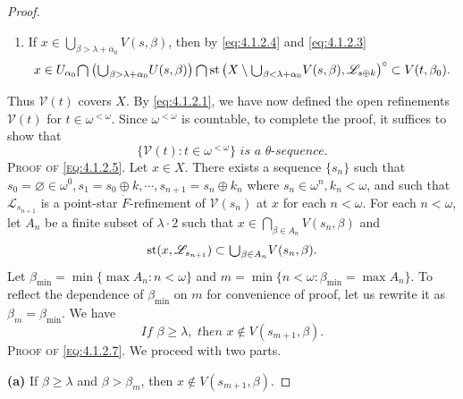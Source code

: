 \documentclass[main.tex]{subfiles}
\begin{document}
\begin{proof}
\begin{enumerate}
$$	\subset V(t, \alpha_{0}).$$
\item[(b)] If $x \in \bigcup_{\beta > \lambda + \alpha_{0}} V(s, \beta)$, 
	then by \eqref{eq:4.1.2.4} and \eqref{eq:4.1.2.3}
	$$ x \in U_{\alpha_{0}} \raisebox{-2pt}{\scalebox{1.5}{$\cap$}} \left(\raisebox{-2pt}{\scalebox{1.5}{$\cup$}}_{\beta > \lambda + \alpha_{0}} U(s, \beta)\right) 
	\raisebox{-2pt}{\scalebox{1.5}{$\cap$}} \operatorname{st}\left(X\setminus\raisebox{-2pt}{\scalebox{1.5}{$\cup$}}_{\beta < \lambda + \alpha_{0}} V(s, \beta), 	\mathscr{L}_{s \oplus k}\right)^{\circ} 
	\subset V(t, \beta_0).$$
\end{enumerate}
Thus $\mathscr{V}(t)$ covers $X$. 
By  \eqref{eq:4.1.2.1}, we have now defined the open refinements 
$\mathscr{V}(t)$ for $t \in \omega^{<\omega}$.
Since $\omega^{<\omega}$ is countable, to complete the proof, it suffices to show that
\begin{equation}
	\{\mathscr{V}(t): t \in \omega^{<\omega}\} \textit{ is a } \theta\textit{-sequence.}  \label{eq:4.1.2.5}
\end{equation}
\textsc{Proof of \eqref{eq:4.1.2.5}}. Let $x \in X$. There exists a sequence $\{s_n\}$ such that 
$s_0 = \varnothing\in \omega^0, s_1 = s_0\oplus k, 
\cdots, s_{n+1} = s_n \oplus k_n$ where $s_n \in \omega^n, k_n < \omega$, 
and such that $\mathscr{L}_{s_{n+1}}$ is a point-star $\dot{F}$-refinement of
$\mathscr{V}(s_n)$ at $x$ for each $n < \omega$.
For each $n < \omega$, let $A_n$ be a finite subset of $\lambda\cdot 2$ such that 
$x \in \bigcap_{\beta \in A_n} V(s_n, \beta)$ and
\begin{equation}
	\operatorname{st}(x, \mathscr{L}_{s_{n+1}}) \subset \raisebox{-2pt}{\scalebox{1.5}{$\cup$}}_{\beta \in A_n} V(s_n, \beta).
   \label{eq:4.1.2.6}  %
\end{equation}
\noindent Let $\beta_{\min} = \min\{\max A_n: n < \omega\}$ and 
$m = \min\{n < \omega: \beta_{\min} = \max A_n\}$. 
To reflect the dependence of $\beta_{\min}$ on $m$ for convenience of proof, 
let us rewrite it as $\beta_m=\beta_{\min}$. We have
\begin{equation}
\textit{If } \beta \ge \lambda, \textit{ then } x \notin V(s_{m+1}, \beta). \label{eq:4.1.2.7}
\end{equation}
\textsc{Proof of \eqref{eq:4.1.2.7}}. We proceed with two parts.

\textbf{(a)} If $\beta \ge \lambda$ and $\beta > \beta_m$, then $x \notin V(s_{m+1}, \beta)$.


\end{proof}
\end{document}

